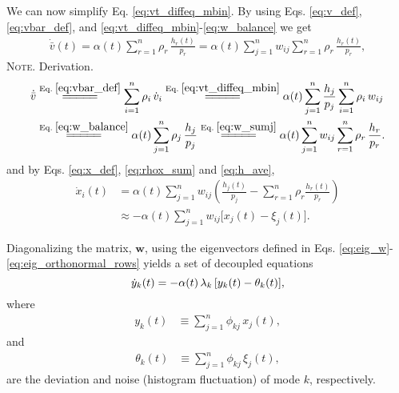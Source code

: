\documentclass[reprint, superscriptaddress, floatfix]{revtex4-1}
\newcommand{\note}[1]{{\color{DarkGreen}\footnotesize \textsc{Note.} #1}}
\begin{document}
We can now simplify Eq. \eqref{eq:vt_diffeq_mbin}.
%
By using Eqs.
\eqref{eq:v_def}, \eqref{eq:vbar_def}, and
\eqref{eq:vt_diffeq_mbin}-\eqref{eq:w_balance}
we get
%
\begin{align*}
  \dot{ \bar v }(t)
  =
  \alpha(t)
  \sum_{r = 1}^n \rho_r
    \, \frac{ h_r(t) } { p_r }
  =
  \alpha(t)
  \sum_{j = 1}^n w_{ij}
  \sum_{r = 1}^n \rho_r
    \, \frac{ h_r(t) } { p_r }
  ,
\end{align*}
%
\note{Derivation.
$$\begin{aligned}
  \dot{ \bar v }
  &
  \stackrel{\mathrm{Eq.\; \eqref{eq:vbar_def}}}
  {=\joinrel=\joinrel=\joinrel=\joinrel=}
  \sum_{i = 1}^n \rho_i \, \dot v_i
  \stackrel{\mathrm{Eq.\; \eqref{eq:vt_diffeq_mbin}}}
  {=\joinrel=\joinrel=\joinrel=\joinrel=}
  \alpha(t)
  \sum_{j = 1}^n \frac{ h_j } { p_j }
                 \sum_{ i = 1 }^{n} \rho_i \, w_{ij}
  \\
  &
  \stackrel{\mathrm{Eq.\; \eqref{eq:w_balance}}}
  {=\joinrel=\joinrel=\joinrel=\joinrel=}
  \alpha(t)
  \sum_{j = 1}^n \rho_j
    \, \frac{ h_j } { p_j }
  \stackrel{\mathrm{Eq.\; \eqref{eq:w_sumj}}}
  {=\joinrel=\joinrel=\joinrel=\joinrel=}
  \alpha(t)
  \sum_{j = 1}^n w_{ij}
  \sum_{r = 1}^n \rho_r
    \, \frac{ h_r } { p_r }
  .
\end{aligned}$$
}
%
and by Eqs. \eqref{eq:x_def}, \eqref{eq:rhox_sum} and \eqref{eq:h_ave},
%
$$
\begin{aligned}
  \dot x_i(t)
  &= \alpha(t) \sum_{j=1}^n w_{ij}
  \left(
    \frac{ h_j(t) } { p_j }
    -
    \sum_{r = 1}^n
      \rho_r \frac{ h_r(t) } { p_r }
  \right)
  \\
  &\approx
  -\alpha(t) \sum_{j = 1}^n
  w_{ij} \bigl[ x_j(t) - \xi_j (t) \bigr]
  .
\end{aligned}
$$

Diagonalizing the matrix, $\mathbf w$,
using the eigenvectors defined in Eqs.
\eqref{eq:eig_w}-\eqref{eq:eig_orthonormal_rows}
yields a set of decoupled equations
%
\begin{equation}
  \dot y_k(t)
  =
  -\alpha(t) \, \lambda_k \, [y_k(t) - \theta_k(t)],
  \notag
\end{equation}
%
where
\begin{align}
  y_k(t)
  &\equiv
  \sum_{j=1}^n
    \phi_{kj} \, x_j(t)
  ,
\end{align}
and
\begin{align}
  \theta_k(t)
  &\equiv
  \sum_{j=1}^n
    \phi_{kj} \, \xi_j(t)
  ,
  \label{eq:theta_def}
\end{align}
%
are the deviation and noise (histogram fluctuation)
of mode $k$, respectively.
\end{document}
